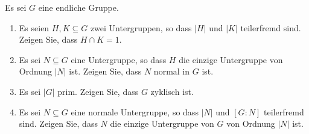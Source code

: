 \begin{question}[subtitle = Zur Ordnung]
  \label{question: basic calculatings with orders}
  Es sei $G$ eine endliche Gruppe.
  \begin{enumerate}
    \item
      Es seien $H, K \subseteq G$ zwei Untergruppen, so dass $|H|$ und $|K|$ teilerfremd sind.
      Zeigen Sie, dass $H \cap K = 1$.
    \item
      Es sei $N \subseteq G$ eine Untergruppe, so dass $H$ die einzige Untergruppe von Ordnung $|N|$ ist.
      Zeigen Sie, dass $N$ normal in $G$ ist.
    \item
      Es sei $|G|$ prim.
      Zeigen Sie, dass $G$ zyklisch ist.
    \item
      Es sei $N \subseteq G$ eine normale Untergruppe, so dass $|N|$ und $[G : N]$ teilerfremd sind.
      Zeigen Sie, dass $N$ die einzige Untergruppe von $G$ von Ordnung $|N|$ ist.
  \end{enumerate}
\end{question}


